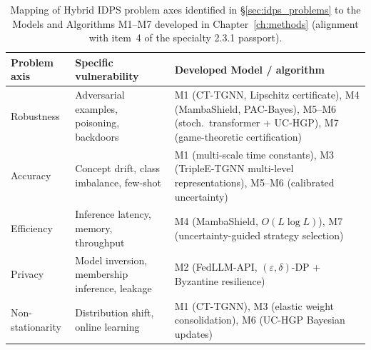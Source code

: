 \begin{table}[H]
\centering
\caption{Mapping of Hybrid IDPS problem axes identified in \S\ref{sec:idps_problems} to the Models and Algorithms M1--M7 developed in Chapter~\ref{ch:methods} (alignment with item~4 of the specialty 2.3.1 passport).}
\label{tab:models_to_methods}
\small
\setlength{\tabcolsep}{4pt}
\renewcommand{\arraystretch}{0.92}\begin{tabular}{p{3.0cm} p{4.5cm} p{6.5cm}}
\toprule
\textbf{Problem axis} & \textbf{Specific vulnerability} & \textbf{Developed Model / algorithm} \\
\midrule
Robustness     & Adversarial examples, poisoning, backdoors
               & M1 (CT-TGNN, Lipschitz certificate), M4 (MambaShield, PAC-Bayes), M5--M6 (stoch.\ transformer + UC-HGP), M7 (game-theoretic certification) \\
\addlinespace
Accuracy       & Concept drift, class imbalance, few-shot
               & M1 (multi-scale time constants), M3 (TripleE-TGNN multi-level representations), M5--M6 (calibrated uncertainty) \\
\addlinespace
Efficiency     & Inference latency, memory, throughput
               & M4 (MambaShield, $O(L\log L)$), M7 (uncertainty-guided strategy selection) \\
\addlinespace
Privacy        & Model inversion, membership inference, leakage
               & M2 (FedLLM-API, $(\varepsilon,\delta)$-DP + Byzantine resilience) \\
\addlinespace
Non-stationarity & Distribution shift, online learning
                 & M1 (CT-TGNN), M3 (elastic weight consolidation), M6 (UC-HGP Bayesian updates) \\
\bottomrule
\end{tabular}\end{table}

